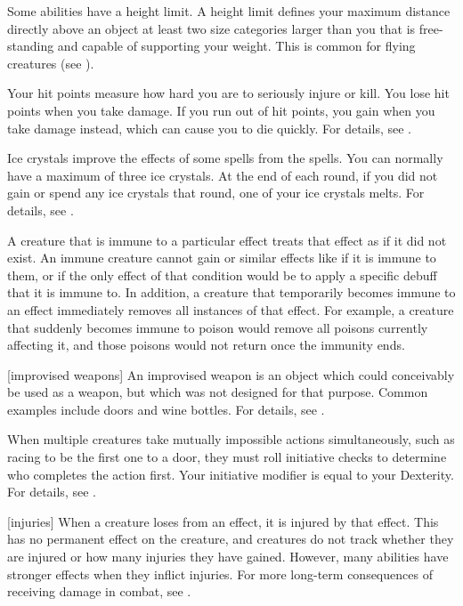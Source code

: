  Some abilities have a height limit.
A height limit defines your maximum distance directly above an object at least two size categories larger than you that is free-standing and capable of supporting your weight.
This is common for flying creatures (see ).

 Your hit points measure how hard you are to seriously injure or kill.
You lose hit points when you take damage.
If you run out of hit points, you gain  when you take damage instead, which can cause you to die quickly.
For details, see .

 Ice crystals improve the effects of some spells from the  spells.
You can normally have a maximum of three ice crystals.
At the end of each round, if you did not gain or spend any ice crystals that round, one of your ice crystals melts.
For details, see .

 A creature that is immune to a particular effect treats that effect as if it did not exist.
An immune creature cannot gain  or similar effects like  if it is immune to them, or if the only effect of that condition would be to apply a specific debuff that it is immune to.
In addition, a creature that temporarily becomes immune to an effect immediately removes all instances of that effect.
For example, a creature that suddenly becomes immune to poison would remove all poisons currently affecting it, and those poisons would not return once the immunity ends.

[improvised weapons] An improvised weapon is an object which could conceivably be used as a weapon, but which was not designed for that purpose.
Common examples include doors and wine bottles.
For details, see .

 When multiple creatures take mutually impossible actions simultaneously, such as racing to be the first one to a door, they must roll initiative checks to determine who completes the action first.
Your initiative modifier is equal to your Dexterity.
For details, see .

[injuries] When a creature loses  from an effect, it is injured by that effect.
This has no permanent effect on the creature, and creatures do not track whether they are injured or how many injuries they have gained.
However, many abilities have stronger effects when they inflict injuries.
For more long-term consequences of receiving damage in combat, see .

